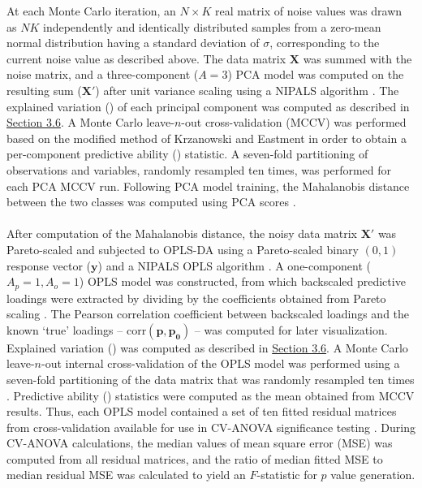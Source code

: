 \begin{doublespace}
At each Monte Carlo iteration, an $N \times K$ real matrix of noise values was
drawn as $NK$ independently and identically distributed samples from a
zero-mean normal distribution having a standard deviation of $\sigma$,
corresponding to the current noise value as described above. The data matrix
$\mathbf{X}$ was summed with the noise matrix, and a three-component ($A = 3$)
PCA model was computed on the resulting sum ($\mathbf{X'}$) after unit variance
scaling \cite{vandenberg:bmcg2006} using a NIPALS algorithm
\cite{jolliffe2002}. The explained variation (\rsq{}) of each principal
component was computed as described in \hyperlink{section.3.6}{Section 3.6}.
A Monte Carlo leave-$n$-out cross-validation (MCCV) was performed based on the
modified method of Krzanowski and Eastment \cite{eshghi:cils2014} in order to
obtain a per-component predictive ability (\qsq{}) statistic. A seven-fold
partitioning of observations and variables, randomly resampled ten times, was
performed for each PCA MCCV run. Following PCA model training, the Mahalanobis
distance between the two classes was computed using PCA scores
\cite{demaesschalck:cils2000}.
\\\\
After computation of the Mahalanobis distance, the noisy data matrix
$\mathbf{X'}$ was Pareto-scaled and subjected to OPLS-DA using a Pareto-scaled
binary $(0,1)$ response vector ($\mathbf{y}$) and a NIPALS OPLS algorithm
\cite{trygg:jchemo2002}. A one-component ($A_p = 1, A_o = 1$) OPLS model was
constructed, from which backscaled predictive loadings were extracted by
dividing by the coefficients obtained from Pareto scaling
\cite{cloarec:anchem2005b}. The Pearson correlation coefficient between
backscaled loadings and the known `true' loadings --
$\mathrm{corr}(\mathbf{p},\mathbf{p_0})$ -- was computed for later
visualization. Explained variation (\rsqy{}) was computed as described in
\hyperlink{section.3.6}{Section 3.6}. A Monte Carlo leave-$n$-out internal
cross-validation of the OPLS model was performed using a seven-fold
partitioning of the data matrix that was randomly resampled ten times
\cite{xu:cils2001}. Predictive ability (\qsq{}) statistics were computed as
the mean \qsq{} obtained from MCCV results. Thus, each OPLS model contained
a set of ten fitted residual matrices from cross-validation available for use
in CV-ANOVA significance testing \cite{eriksson:jchemo2008}. During CV-ANOVA
calculations, the median values of mean square error (MSE) was computed from
all residual matrices, and the ratio of median fitted MSE to median residual
MSE was calculated to yield an $F$-statistic for $p$ value generation.
\end{doublespace}

